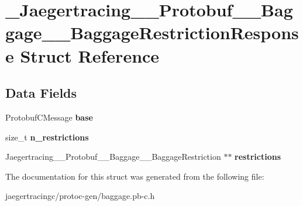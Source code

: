 \hypertarget{struct__Jaegertracing____Protobuf____Baggage____BaggageRestrictionResponse}{}\section{\+\_\+\+Jaegertracing\+\_\+\+\_\+\+Protobuf\+\_\+\+\_\+\+Baggage\+\_\+\+\_\+\+Baggage\+Restriction\+Response Struct Reference}
\label{struct__Jaegertracing____Protobuf____Baggage____BaggageRestrictionResponse}
\subsection*{Data Fields}
\begin{DoxyCompactItemize}
\item 
\mbox{\label{struct__Jaegertracing____Protobuf____Baggage____BaggageRestrictionResponse_a6d09649590302c8fd802707a230591a3}} 
Protobuf\+C\+Message {\bfseries base}
\item 
\mbox{\label{struct__Jaegertracing____Protobuf____Baggage____BaggageRestrictionResponse_adace166f4d38a222e671e60dab343f49}} 
size\+\_\+t {\bfseries n\+\_\+restrictions}
\item 
\mbox{\label{struct__Jaegertracing____Protobuf____Baggage____BaggageRestrictionResponse_a6ae14900014b297f476a7e7f3b8235d2}} 
Jaegertracing\+\_\+\+\_\+\+Protobuf\+\_\+\+\_\+\+Baggage\+\_\+\+\_\+\+Baggage\+Restriction $\ast$$\ast$ {\bfseries restrictions}
\end{DoxyCompactItemize}


The documentation for this struct was generated from the following file\+:\begin{DoxyCompactItemize}
\item 
jaegertracingc/protoc-\/gen/baggage.\+pb-\/c.\+h\end{DoxyCompactItemize}
